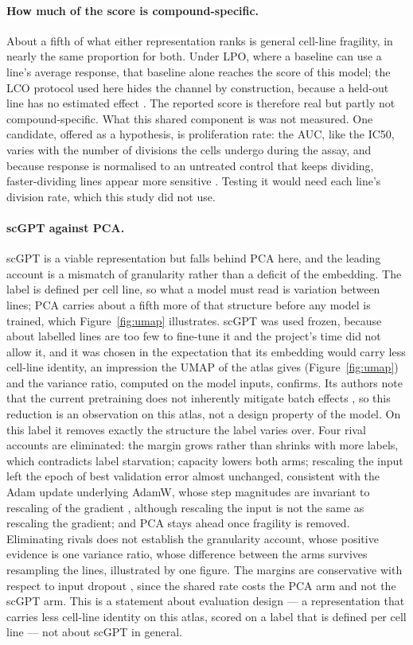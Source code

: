 \paragraph{How much of the score is compound-specific.} About a fifth of what either representation ranks is
general cell-line fragility, in nearly the same proportion for both. Under LPO, where a
baseline can use a line's average response, that baseline alone reaches the score of this model; the
LCO protocol used here hides the channel by construction, because a held-out line has no estimated
effect \cite{dreval}. The reported score is therefore real but partly not compound-specific. What this shared component is
was not measured. One candidate, offered as a hypothesis, is proliferation rate: the AUC, like the IC50,
varies with the number of divisions the cells undergo during the assay, and because response is
normalised to an untreated control that keeps dividing, faster-dividing lines appear more sensitive
\cite{hafner}. Testing it would need each line's division rate, which this study did not use.

\paragraph{scGPT against PCA.} scGPT is a viable representation but falls behind PCA here, and the
leading account is a mismatch of granularity rather than a deficit of the embedding. The label is
defined per cell line, so what a model must read is variation between lines; PCA carries about a fifth
more of that structure before any model is trained, which Figure~\ref{fig:umap} illustrates.
scGPT was used frozen, because about \NLinesCV{} labelled lines are too few to fine-tune it and the
project's time did not allow it, and it was
chosen in the expectation that its embedding would carry less cell-line identity, an impression the UMAP
of the atlas gives (Figure~\ref{fig:umap}) and the variance ratio, computed on the model inputs,
confirms. Its authors note that the current pretraining does not
inherently mitigate batch effects \cite{scgpt}, so this reduction is an observation on this atlas, not a
design property of the model. On this label it removes exactly the structure the label varies over. Four rival accounts are eliminated: the margin grows rather than shrinks with more labels,
which contradicts label starvation; capacity lowers both arms; rescaling the input left
the epoch of best validation error almost unchanged, consistent with the Adam update underlying AdamW,
whose step magnitudes are invariant to rescaling of the gradient \cite{kingma2015adam}, although
rescaling the input is not the same as rescaling the gradient; and PCA stays ahead once fragility is removed. Eliminating rivals does not
establish the granularity account, whose positive evidence is one variance ratio, whose difference between the arms survives resampling
the lines, illustrated by one figure. The
margins are conservative with respect to input dropout \cite{srivastava2014}, since the shared rate costs the PCA arm and not
the scGPT arm. This is a statement about evaluation design --- a representation
that carries less cell-line identity on this atlas, scored on a label that is defined per cell line ---
not about scGPT in general.

